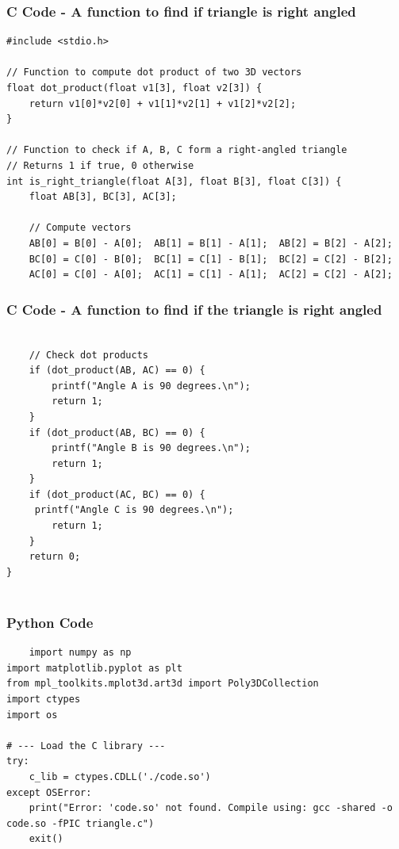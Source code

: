 \documentclass{beamer}
\begin{document}
\begin{frame}[fragile]
    \frametitle{C Code - A function to find if triangle is right angled }

    \begin{lstlisting}
#include <stdio.h>

// Function to compute dot product of two 3D vectors
float dot_product(float v1[3], float v2[3]) {
    return v1[0]*v2[0] + v1[1]*v2[1] + v1[2]*v2[2];
}

// Function to check if A, B, C form a right-angled triangle
// Returns 1 if true, 0 otherwise
int is_right_triangle(float A[3], float B[3], float C[3]) {
    float AB[3], BC[3], AC[3];

    // Compute vectors
    AB[0] = B[0] - A[0];  AB[1] = B[1] - A[1];  AB[2] = B[2] - A[2];
    BC[0] = C[0] - B[0];  BC[1] = C[1] - B[1];  BC[2] = C[2] - B[2];
    AC[0] = C[0] - A[0];  AC[1] = C[1] - A[1];  AC[2] = C[2] - A[2];
     \end{lstlisting}
\end{frame}

\begin{frame}[fragile]
    \frametitle{C Code - A function to find if the triangle is right angled  }

    \begin{lstlisting}

    // Check dot products
    if (dot_product(AB, AC) == 0) {
        printf("Angle A is 90 degrees.\n");
        return 1;
    }
    if (dot_product(AB, BC) == 0) {
        printf("Angle B is 90 degrees.\n");
        return 1;
    }
    if (dot_product(AC, BC) == 0) {
     printf("Angle C is 90 degrees.\n");
        return 1;
    }
    return 0;
}
    
     \end{lstlisting}
\end{frame}

\begin{frame}[fragile]
    \frametitle{Python Code}
    \begin{lstlisting}
    import numpy as np
import matplotlib.pyplot as plt
from mpl_toolkits.mplot3d.art3d import Poly3DCollection
import ctypes
import os

# --- Load the C library ---
try:
    c_lib = ctypes.CDLL('./code.so')
except OSError:
    print("Error: 'code.so' not found. Compile using: gcc -shared -o code.so -fPIC triangle.c")
    exit()
    \end{lstlisting}
\end{frame}
\end{document}
